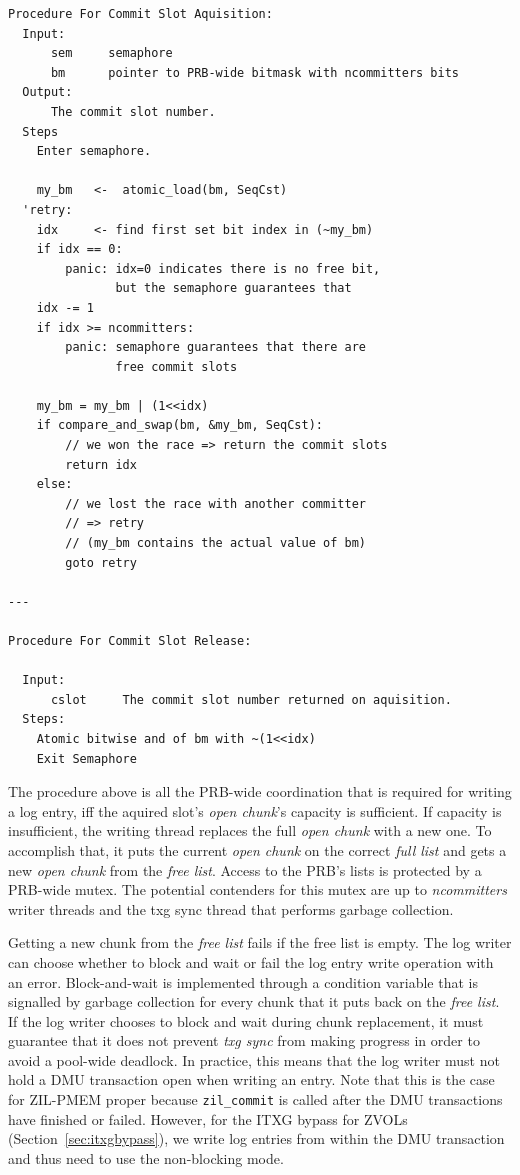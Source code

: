 \documentclass[12pt,a4paper,twoside]{book}
\begin{document}
\begin{lstlisting}[style=figurepseudocode]
Procedure For Commit Slot Aquisition:
  Input:
      sem     semaphore
      bm      pointer to PRB-wide bitmask with ncommitters bits
  Output:
      The commit slot number.
  Steps
    Enter semaphore.

    my_bm   <-  atomic_load(bm, SeqCst)
  'retry:
    idx     <- find first set bit index in (~my_bm)
    if idx == 0:
        panic: idx=0 indicates there is no free bit,
               but the semaphore guarantees that
    idx -= 1
    if idx >= ncommitters:
        panic: semaphore guarantees that there are
               free commit slots

    my_bm = my_bm | (1<<idx)
    if compare_and_swap(bm, &my_bm, SeqCst):
        // we won the race => return the commit slots
        return idx
    else:
        // we lost the race with another committer
        // => retry
        // (my_bm contains the actual value of bm)
        goto retry

---

Procedure For Commit Slot Release:

  Input:
      cslot     The commit slot number returned on aquisition.
  Steps:
    Atomic bitwise and of bm with ~(1<<idx)
    Exit Semaphore
\end{lstlisting}

The procedure above is all the PRB-wide coordination that is required for writing a log entry, iff the aquired slot's \textit{open chunk}'s capacity is sufficient.
If capacity is insufficient, the writing thread replaces the full \textit{open chunk} with a new one.
To accomplish that, it puts the current \textit{open chunk} on the correct \textit{full list} and gets a new \textit{open chunk} from the \textit{free list}.
Access to the PRB's lists is protected by a PRB-wide mutex.
The potential contenders for this mutex are up to \textit{ncommitters} writer threads and the txg sync thread that performs garbage collection.

Getting a new chunk from the \textit{free list} fails if the free list is empty.
The log writer can choose whether to block and wait or fail the log entry write operation with an error.
Block-and-wait is implemented through a condition variable that is signalled by garbage collection for every chunk that it puts back on the \textit{free list}.
If the log writer chooses to block and wait during chunk replacement, it must guarantee that it does not prevent \textit{txg sync} from making progress in order to avoid a pool-wide deadlock.
In practice, this means that the log writer must not hold a DMU transaction open when writing an entry.
Note that this is the case for ZIL-PMEM proper because \lstinline{zil_commit} is called after the DMU transactions have finished or failed.
However, for the ITXG bypass for ZVOLs (Section~\ref{sec:itxgbypass}), we write log entries from within the DMU transaction and thus need to use the non-blocking mode.
\end{document}
